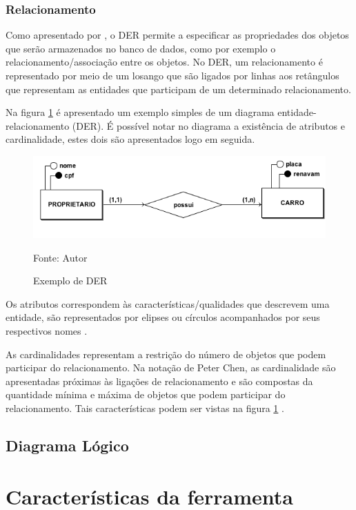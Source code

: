 \subsection{Relacionamento}
Como apresentado por , o DER permite a especificar as propriedades dos objetos
que serão armazenados no banco de dados, como por exemplo o relacionamento/associação entre os objetos. No DER,
um relacionamento é representado por meio de um losango que são ligados por linhas aos retângulos que representam
as entidades que participam de um determinado relacionamento.

Na figura \ref{figura1} é apresentado um exemplo simples de um diagrama entidade-relacionamento (DER). É possível notar 
no diagrama a existência de atributos e cardinalidade, estes dois são apresentados logo em seguida.

\begin{figure}[h]
	\centering
	\includegraphics[keepaspectratio=true,scale=0.5]{figuras/figura1.png}
	\caption{Exemplo de DER}
	Fonte: Autor
	\label{figura1}
\end{figure}

Os atributos correspondem às características/qualidades que descrevem uma entidade, são representados por
elipses ou círculos acompanhados por seus respectivos nomes \cite{sistemadebancos}.

As cardinalidades representam a restrição do número de objetos que podem participar do relacionamento. Na notação
de Peter Chen, as cardinalidade são apresentadas próximas às ligações de relacionamento e são compostas da quantidade
mínima e máxima de objetos que podem participar do relacionamento. Tais características podem ser vistas 
na figura \ref{figura1} \cite{sistemadebancos}.

\section{Diagrama Lógico}



\chapter{Características da ferramenta}

